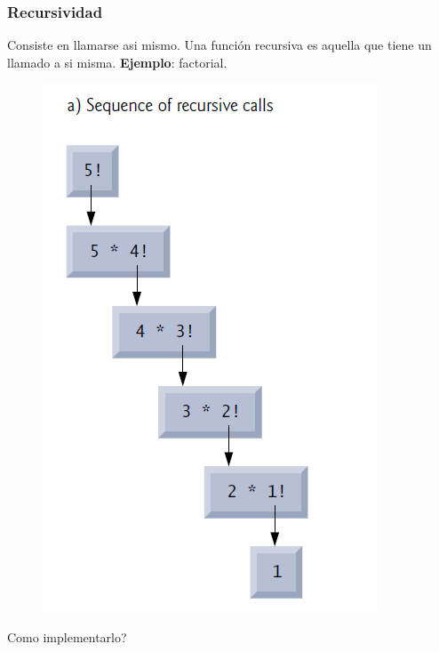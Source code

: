 \documentclass[10.5pt,scale=1.0,t,aspectratio=169,hyperref={pdfpagelabels=false}]{beamer}
\begin{document}
\begin{frame}
	\frametitle{Recursividad}
	Consiste en llamarse asi mismo. Una función recursiva es aquella que tiene un llamado a si misma. \textbf{Ejemplo}: factorial.
	\begin{figure}
		\centering
		\includegraphics[scale=0.5]{Factorial}
	\end{figure}
	Como implementarlo? 
\end{frame}
\end{document}
